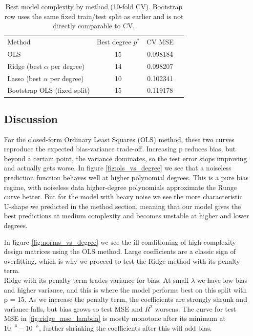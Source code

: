 \documentclass[amssymb,twocolumn,aps]{revtex4-2}
\begin{document}
\begin{table}[h!]
\caption{Best model complexity by method (10-fold CV). Bootstrap row uses the same fixed train/test split as earlier and is not directly comparable to CV.}
\label{tab:best-degrees-cv}
\begin{ruledtabular}
\begin{tabular}{lccc}
Method & Best degree $p^\ast$ & CV MSE  \\
\colrule
OLS                                & 15 & 0.098184 \\
Ridge (best $\alpha$ per degree)   & 14 & 0.098207 \\
Lasso (best $\alpha$ per degree)   & 10 & 0.102341  \\
Bootstrap OLS (fixed split)        & 15 & 0.119178 \\
\end{tabular}
\end{ruledtabular}
\end{table}


\subsection{Discussion}

For the closed-form Ordinary Least Squares (OLS) method, these two curves reproduce the expected bias-variance trade-off. Increasing p reduces bias, but beyond a certain point, the variance dominates, so the test error stops improving and actually gets worse. In figure \ref{fig:ols_vs_degree} we see that a noiseless prediction function behaves well at higher polynomial degrees. This is a pure bias regime, with noiseless data higher-degree polynomials approximate the Runge curve better. But for the model with heavy noise we see the more characteristic U-shape we predicted in the method section, meaning that our model gives the best predictions at medium complexity and becomes unstable at higher and lower degrees.

In figure \ref{fig:norms_vs_degree} we see the ill-conditioning of high-complexity design matrices using the OLS method. Large coefficients are a classic sign of overfitting, which is why we proceed to test the Ridge method with its penalty term. \\

Ridge with its penalty term trades variance for bias. At small $\lambda$ we have low bias and higher variance, and this is where the model performs best on this split with p = 15. As we increase the penalty term, the coefficients are strongly shrunk and variance falls, but bias grows so test MSE and $R^2$ worsens. The curve for test MSE in \ref{fig:ridge_mse_lambda} is mostly monotone after its minimum at $10^{-4}-10^{-5}$, further shrinking the coefficients after this will add bias. \\
\end{document}
